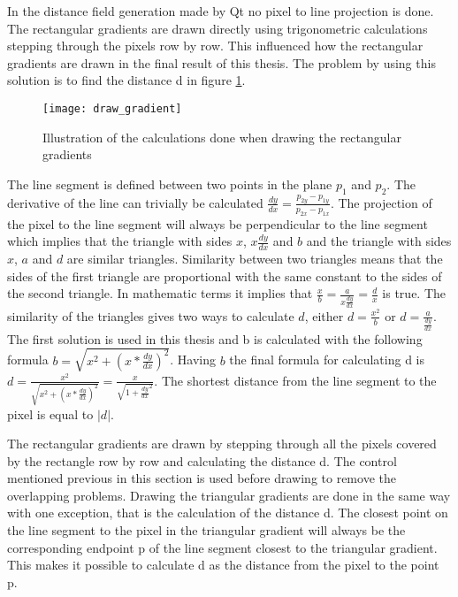 In the distance field generation made by Qt no pixel to line projection is done. The rectangular gradients are drawn directly using trigonometric calculations stepping through the pixels row by row. This influenced how the rectangular gradients are drawn in the final result of this thesis. The problem by using this solution is to find the distance d in figure \ref{fig:distanced}.

\begin{figure}[H]
\texttt{[image: draw\_gradient]}
\caption{Illustration of the calculations done when drawing the rectangular gradients}
\label{fig:distanced}
\end{figure}

The line segment is defined between two points in the plane $p_1$ and $p_2$. The derivative of the line can trivially be calculated $\frac{dy}{dx}=\frac{p_{2y}-p_{1y}}{p_{2x}-p_{1x}}$. The projection of the pixel to the line segment will always be perpendicular to the line segment which implies that the triangle with sides $x$, $x\frac{dy}{dx}$ and $b$ and the triangle with sides $x$, $a$ and $d$ are similar triangles. Similarity between two triangles means that the sides of the first triangle are proportional with the same constant to the sides of the second triangle. In mathematic terms it implies that $\frac{x}{b}=\frac{a}{x\frac{dy}{dx}}=\frac{d}{x}$ is true. The similarity of the triangles gives two ways to calculate $d$, either $d=\frac{x^2}{b}$ or $d=\frac{a}{\frac{dy}{dx}}$. The first solution is used in this thesis and b is calculated with the following formula $b=\sqrt{x^2+(x*\frac{dy}{dx})^2}$. Having $b$ the final formula for calculating d is $d=\frac{x^2}{\sqrt{x^2+(x*\frac{dy}{dx})^2}}=\frac{x}{\sqrt{1+\frac{dy}{dx}^2}}$. The shortest distance from the line segment to the pixel is equal to $|d|$.

The rectangular gradients are drawn by stepping through all the pixels covered by the rectangle row by row and calculating the distance d. The control mentioned previous in this section is used before drawing to remove the overlapping problems. Drawing the triangular gradients are done in the same way with one exception, that is the calculation of the distance d. The closest point on the line segment to the pixel in the triangular gradient will always be the corresponding endpoint p of the line segment closest to the triangular gradient. This makes it possible to calculate d as the distance from the pixel to the point p.

